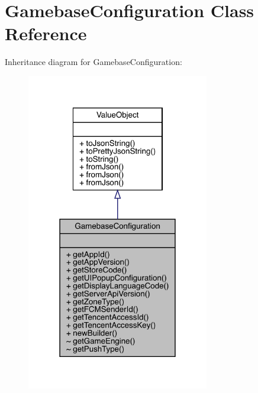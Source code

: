 \hypertarget{classcom_1_1toast_1_1android_1_1gamebase_1_1_gamebase_configuration}{}\section{Gamebase\+Configuration Class Reference}
\label{classcom_1_1toast_1_1android_1_1gamebase_1_1_gamebase_configuration}


Inheritance diagram for Gamebase\+Configuration\+:
\nopagebreak
\begin{figure}[H]
\begin{center}
\leavevmode
\includegraphics[width=226pt]{classcom_1_1toast_1_1android_1_1gamebase_1_1_gamebase_configuration__inherit__graph}
\end{center}
\end{figure}



